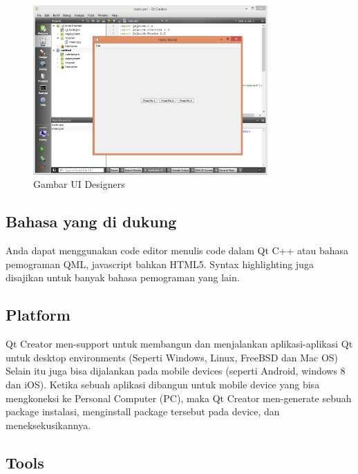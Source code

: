 \begin{figure}[htbp]
\centering
\includegraphics[width=0.8\textwidth]{../manuscript/images/Capture1-3.PNG}
\caption{Gambar UI Designers}
\label{fig:gambar-ui-designers}
\end{figure}

\subsection{Bahasa yang di dukung}\label{bahasa-yang-di-dukung}

Anda dapat menggunakan code editor menulis code dalam Qt C++ atau bahasa
pemograman QML, javascript bahkan HTML5. Syntax highlighting juga
disajikan untuk banyak bahasa pemograman yang lain.

\subsection{Platform}\label{platform}

Qt Creator men-support untuk membangun dan menjalankan aplikasi-aplikasi
Qt untuk desktop environments (Seperti Windows, Linux, FreeBSD dan Mac
OS) Selain itu juga bisa dijalankan pada mobile devices (seperti
Android, windows 8 dan iOS). Ketika sebuah aplikasi dibangun untuk
mobile device yang bisa mengkoneksi ke Personal Computer (PC), maka Qt
Creator men-generate sebuah package instalasi, menginstall package
tersebut pada device, dan meneksekusikannya.

\subsection{Tools}\label{tools}


